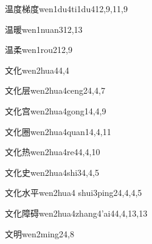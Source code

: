 \begin{entry}{温度梯度}{wen1du4ti1du4}{12,9,11,9}
\end{entry}

\begin{entry}{温暖}{wen1nuan3}{12,13}
\end{entry}

\begin{entry}{温柔}{wen1rou2}{12,9}
\end{entry}

\begin{entry}{文化}{wen2hua4}{4,4}
\end{entry}

\begin{entry}{文化层}{wen2hua4ceng2}{4,4,7}
\end{entry}

\begin{entry}{文化宫}{wen2hua4gong1}{4,4,9}
\end{entry}

\begin{entry}{文化圈}{wen2hua4quan1}{4,4,11}
\end{entry}

\begin{entry}{文化热}{wen2hua4re4}{4,4,10}
\end{entry}

\begin{entry}{文化史}{wen2hua4shi3}{4,4,5}
\end{entry}

\begin{entry}{文化水平}{wen2hua4 shui3ping2}{4,4,4,5}
\end{entry}

\begin{entry}{文化障碍}{wen2hua4zhang4'ai4}{4,4,13,13}
\end{entry}

\begin{entry}{文明}{wen2ming2}{4,8}
\end{entry}

